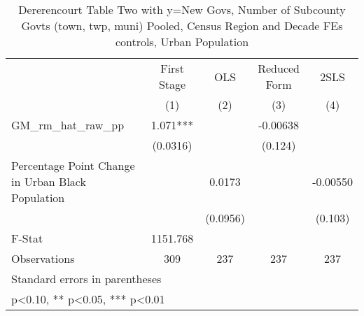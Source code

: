 \begin{table}[htbp]\centering
\def\sym#1{\ifmmode^{#1}\else\(^{#1}\)\fi}
\caption{Dererencourt Table Two with y=New Govs, Number of Subcounty Govts (town, twp, muni)  Pooled, Census Region and Decade FEs controls, Urban Population}
\begin{tabular}{l*{4}{c}}
\toprule
                    & First Stage   &         OLS   &Reduced Form   &        2SLS   \\
                    &\multicolumn{1}{c}{(1)}   &\multicolumn{1}{c}{(2)}   &\multicolumn{1}{c}{(3)}   &\multicolumn{1}{c}{(4)}   \\
\midrule
GM\_rm\_hat\_raw\_pp    &       1.071***&               &    -0.00638   &               \\
                    &    (0.0316)   &               &     (0.124)   &               \\
\addlinespace
Percentage Point Change in Urban Black Population&               &      0.0173   &               &    -0.00550   \\
                    &               &    (0.0956)   &               &     (0.103)   \\
\midrule
F-Stat              &    1151.768   &               &               &               \\
Observations        &         309   &         237   &         237   &         237   \\
\bottomrule
\multicolumn{5}{l}{\footnotesize Standard errors in parentheses}\\
\multicolumn{5}{l}{\footnotesize * p<0.10, ** p<0.05, *** p<0.01}\\
\end{tabular}
\end{table}
